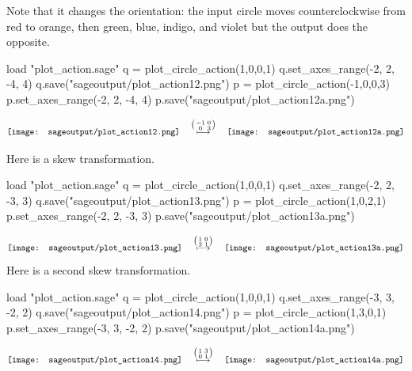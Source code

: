 Note that it changes the orientation: the input circle moves 
counterclockwise from red to orange, then green, blue, indigo, and violet
but the output does the opposite. 
\begin{sageoutput}[d,0,4;d,5,7]
load "plot_action.sage"
q = plot_circle_action(1,0,0,1) 
q.set_axes_range(-2, 2, -4, 4) 
q.save("sageoutput/plot_action12.png")
p = plot_circle_action(-1,0,0,3) 
p.set_axes_range(-2, 2, -4, 4) 
p.save("sageoutput/plot_action12a.png")
\end{sageoutput}
\begin{equation*}
  \vcenteredhbox{\texttt{[image: sageoutput/plot\_action12.png]}}
  \quad\mapsunder{\big (\begin{smallmatrix} -1 &0 \\ 0 &3 \end{smallmatrix}\big )}\quad
  \vcenteredhbox{\texttt{[image: sageoutput/plot\_action12a.png]}}
\end{equation*}

Here is a skew transformation. 
\begin{sageoutput}[d,0,4;d,5,7]
load "plot_action.sage"
q = plot_circle_action(1,0,0,1) 
q.set_axes_range(-2, 2, -3, 3) 
q.save("sageoutput/plot_action13.png")
p = plot_circle_action(1,0,2,1) 
p.set_axes_range(-2, 2, -3, 3) 
p.save("sageoutput/plot_action13a.png")
\end{sageoutput}
\begin{equation*}
  \vcenteredhbox{\texttt{[image: sageoutput/plot\_action13.png]}}
  \quad\mapsunder{\big (\begin{smallmatrix} 1 &0 \\ 2 &1 \end{smallmatrix}\big )}\quad
  \vcenteredhbox{\texttt{[image: sageoutput/plot\_action13a.png]}}
\end{equation*}
\noindent Here is a  second skew
transformation. 
\begin{sageoutput}[d,0,4;d,5,7]
load "plot_action.sage"
q = plot_circle_action(1,0,0,1) 
q.set_axes_range(-3, 3, -2, 2) 
q.save("sageoutput/plot_action14.png")
p = plot_circle_action(1,3,0,1) 
p.set_axes_range(-3, 3, -2, 2) 
p.save("sageoutput/plot_action14a.png")
\end{sageoutput}
\begin{equation*}
  \vcenteredhbox{\texttt{[image: sageoutput/plot\_action14.png]}}
  \quad\mapsunder{\big (\begin{smallmatrix} 1 &3 \\ 0 &1 \end{smallmatrix}\big )}\quad
  \vcenteredhbox{\texttt{[image: sageoutput/plot\_action14a.png]}}
\end{equation*}

